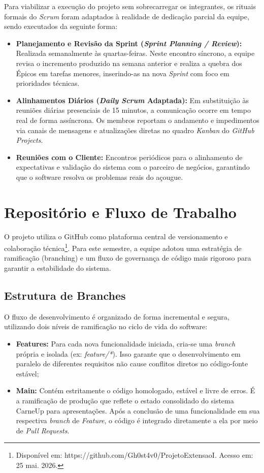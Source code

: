 \documentclass[
	12pt,				%
	openany,			%
	oneside,			%
	a4paper,			%
	english,			%
	french,				%
	spanish,			%
	brazil				%
	]{abntex2}
\begin{document}
Para viabilizar a execução do projeto sem sobrecarregar os integrantes, os rituais formais do \textit{Scrum} foram adaptados à realidade de dedicação parcial da equipe, sendo executados da seguinte forma:

\begin{itemize}
    \item \textbf{Planejamento e Revisão da Sprint (\textit{Sprint Planning / Review}):} Realizada semanalmente às quartas-feiras. Neste encontro síncrono, a equipe revisa o incremento produzido na semana anterior e realiza a quebra dos Épicos em tarefas menores, inserindo-as na nova \textit{Sprint} com foco em prioridades técnicas.
    \item \textbf{Alinhamentos Diários (\textit{Daily Scrum} Adaptada):} Em substituição às reuniões diárias presenciais de 15 minutos, a comunicação ocorre em tempo real de forma assíncrona. Os membros reportam o andamento e impedimentos via canais de mensagens e atualizações diretas no quadro \textit{Kanban} do \textit{GitHub Projects}.
    \item \textbf{Reuniões com o Cliente:} Encontros periódicos para o alinhamento de expectativas e validação do sistema com o parceiro de negócios, garantindo que o software resolva os problemas reais do açougue.
\end{itemize}

\section{Repositório e Fluxo de Trabalho}

O projeto utiliza o GitHub como plataforma central de versionamento e colaboração técnica\footnote{Disponível em: https://github.com/Gh0st4v0/ProjetoExtensaoI. Acesso em: 25 mai. 2026.}. Para este semestre, a equipe adotou uma estratégia de ramificação (branching) e um fluxo de governança de código mais rigoroso para garantir a estabilidade do sistema.

\subsection{Estrutura de Branches}

O fluxo de desenvolvimento é organizado de forma incremental e segura, utilizando dois níveis de ramificação no ciclo de vida do software:

\begin{itemize}
    \item \textbf{Features:} Para cada nova funcionalidade iniciada, cria-se uma \textit{branch} própria e isolada (ex: \textit{feature/*}). Isso garante que o desenvolvimento em paralelo de diferentes requisitos não cause conflitos diretos no código-fonte estável;
    \item \textbf{Main:} Contém estritamente o código homologado, estável e livre de erros. É a ramificação de produção que reflete o estado consolidado do sistema CarneUp para apresentações. Após a conclusão de uma funcionalidade em sua respectiva \textit{branch} de \textit{Feature}, o código é integrado diretamente a ela por meio de \textit{Pull Requests}.
\end{itemize}
\end{document}
